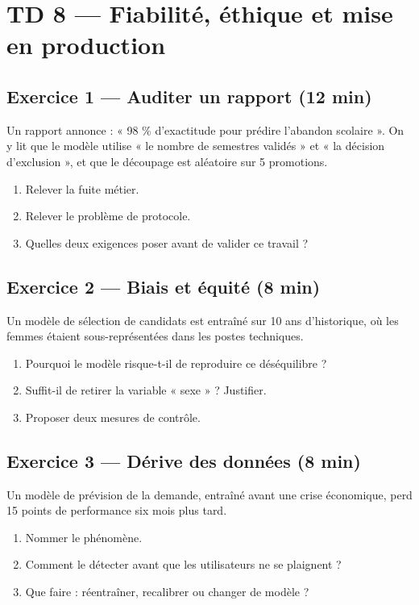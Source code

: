 \section*{TD 8 --- Fiabilité, éthique et mise en production}

\subsection*{Exercice 1 --- Auditer un rapport \hfill \normalfont\footnotesize (12 min)}
Un rapport annonce : « 98 \% d'exactitude pour prédire l'abandon scolaire ».
On y lit que le modèle utilise « le nombre de semestres validés » et « la
décision d'exclusion », et que le découpage est aléatoire sur 5 promotions.
\begin{enumerate}
  \item Relever la fuite métier.
  \item Relever le problème de protocole.
  \item Quelles deux exigences poser avant de valider ce travail ?
\end{enumerate}

\subsection*{Exercice 2 --- Biais et équité \hfill \normalfont\footnotesize (8 min)}
Un modèle de sélection de candidats est entraîné sur 10 ans d'historique, où
les femmes étaient sous-représentées dans les postes techniques.
\begin{enumerate}
  \item Pourquoi le modèle risque-t-il de reproduire ce déséquilibre ?
  \item Suffit-il de retirer la variable « sexe » ? Justifier.
  \item Proposer deux mesures de contrôle.
\end{enumerate}

\subsection*{Exercice 3 --- Dérive des données \hfill \normalfont\footnotesize (8 min)}
Un modèle de prévision de la demande, entraîné avant une crise économique,
perd 15 points de performance six mois plus tard.
\begin{enumerate}
  \item Nommer le phénomène.
  \item Comment le détecter avant que les utilisateurs ne se plaignent ?
  \item Que faire : réentraîner, recalibrer ou changer de modèle ?
\end{enumerate}

